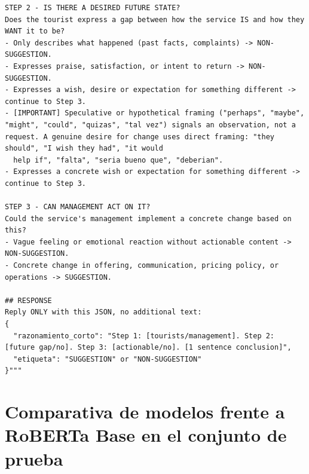 \begin{lstlisting}[caption={System Prompt utilizado en el módulo de clasificación}, label=lst:systemprompt, basicstyle=\ttfamily\small, frame=single, backgroundcolor=\color{lightgray!10}]
STEP 2 - IS THERE A DESIRED FUTURE STATE?
Does the tourist express a gap between how the service IS and how they WANT it to be?
- Only describes what happened (past facts, complaints) -> NON-SUGGESTION.
- Expresses praise, satisfaction, or intent to return -> NON-SUGGESTION.
- Expresses a wish, desire or expectation for something different -> continue to Step 3.
- [IMPORTANT] Speculative or hypothetical framing ("perhaps", "maybe", "might", "could", "quizas", "tal vez") signals an observation, not a request. A genuine desire for change uses direct framing: "they should", "I wish they had", "it would
  help if", "falta", "seria bueno que", "deberian".
- Expresses a concrete wish or expectation for something different -> continue to Step 3.

STEP 3 - CAN MANAGEMENT ACT ON IT?
Could the service's management implement a concrete change based on this?
- Vague feeling or emotional reaction without actionable content -> NON-SUGGESTION.
- Concrete change in offering, communication, pricing policy, or operations -> SUGGESTION.

## RESPONSE
Reply ONLY with this JSON, no additional text:
{
  "razonamiento_corto": "Step 1: [tourists/management]. Step 2: [future gap/no]. Step 3: [actionable/no]. [1 sentence conclusion]",
  "etiqueta": "SUGGESTION" or "NON-SUGGESTION"
}"""
\end{lstlisting}




\section{Comparativa de modelos frente a RoBERTa Base en el conjunto de prueba}
\label{fig:Comparativa de modelos frente a RoBERTa Base en el conjunto de prueba}

